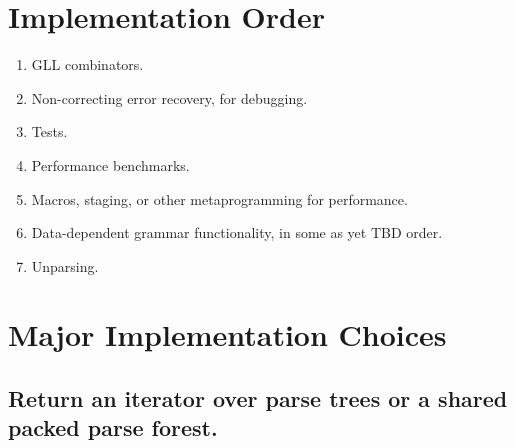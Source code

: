 \documentclass[12pt]{article}
\begin{document}
\section{Implementation Order}
\label{sec:implementation_order}

\begin{enumerate}
\item GLL combinators.
\item Non-correcting error recovery, for debugging.
\item Tests.
\item Performance benchmarks.
\item Macros, staging, or other metaprogramming for performance.
\item Data-dependent grammar functionality, in some as yet TBD order.
\item Unparsing.
\end{enumerate}


\section{Major Implementation Choices}
\label{sec:implementation_choices}

\subsection{Return an iterator over parse trees or a shared packed
  parse forest.}
\label{sec:iterator_sppf}
\end{document}
